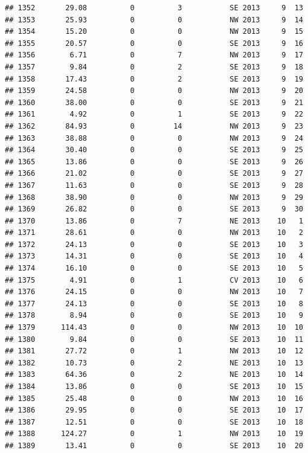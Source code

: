 \documentclass[
]{article}
\begin{document}
\begin{verbatim}
## 1352       29.08          0          3           SE 2013     9  13
## 1353       25.93          0          0           NW 2013     9  14
## 1354       15.20          0          0           NW 2013     9  15
## 1355       20.57          0          0           SE 2013     9  16
## 1356        6.71          0          7           NW 2013     9  17
## 1357        9.84          0          2           SE 2013     9  18
## 1358       17.43          0          2           SE 2013     9  19
## 1359       24.58          0          0           NW 2013     9  20
## 1360       38.00          0          0           SE 2013     9  21
## 1361        4.92          0          1           SE 2013     9  22
## 1362       84.93          0         14           NW 2013     9  23
## 1363       38.88          0          0           NW 2013     9  24
## 1364       30.40          0          0           SE 2013     9  25
## 1365       13.86          0          0           SE 2013     9  26
## 1366       21.02          0          0           SE 2013     9  27
## 1367       11.63          0          0           SE 2013     9  28
## 1368       38.90          0          0           NW 2013     9  29
## 1369       26.82          0          0           SE 2013     9  30
## 1370       13.86          0          7           NE 2013    10   1
## 1371       28.61          0          0           NW 2013    10   2
## 1372       24.13          0          0           SE 2013    10   3
## 1373       14.31          0          0           SE 2013    10   4
## 1374       16.10          0          0           SE 2013    10   5
## 1375        4.91          0          1           CV 2013    10   6
## 1376       24.15          0          0           NW 2013    10   7
## 1377       24.13          0          0           SE 2013    10   8
## 1378        8.94          0          0           SE 2013    10   9
## 1379      114.43          0          0           NW 2013    10  10
## 1380        9.84          0          0           SE 2013    10  11
## 1381       27.72          0          1           NW 2013    10  12
## 1382       10.73          0          2           NE 2013    10  13
## 1383       64.36          0          2           NE 2013    10  14
## 1384       13.86          0          0           SE 2013    10  15
## 1385       25.48          0          0           NW 2013    10  16
## 1386       29.95          0          0           SE 2013    10  17
## 1387       12.51          0          0           SE 2013    10  18
## 1388      124.27          0          1           NW 2013    10  19
## 1389       13.41          0          0           SE 2013    10  20

\end{verbatim}
\end{document}
